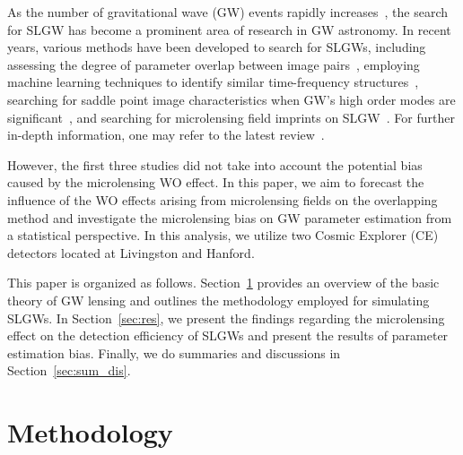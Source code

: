 \documentclass[fleqn,usenatbib]{mnras}
\begin{document}
As the number of gravitational wave (GW) events rapidly increases~\citep{LIGOScientific:2018mvr, abbott2021gwtc2, LIGOScientific:2021djp}, the search for SLGW has become a prominent area of research in GW astronomy.
In recent years, various methods have been developed to search for SLGWs, including assessing the degree of parameter overlap between image pairs~\citep{Haris:2018vmn, Dai:2020tpj, Lo:2021nae, Gao:2023uxi}, employing machine learning techniques to identify similar time-frequency structures~\citep{Kim:2020xkm, Goyal:2021hxv}, searching for saddle point image characteristics when GW's high order modes are significant~\citep{Dai:2017huk, Wang:2021kzt, Janquart:2021nus}, and searching for microlensing field imprints on SLGW~\citep{Shan:2023ngi}.
For further in-depth information, one may refer to the latest review~\citep{Liao:2022gde}.

However, the first three studies did not take into account the potential bias caused by the microlensing WO effect.
In this paper, we aim to forecast the influence of the WO effects arising from microlensing fields on the overlapping method and investigate the microlensing bias on GW parameter estimation from a statistical perspective.
In this analysis, we utilize two Cosmic Explorer (CE)~\citep{Evans:2016mbw} detectors located at Livingston and Hanford.

This paper is organized as follows. 
Section~\ref{sec:met} provides an overview of the basic theory of GW lensing and outlines the methodology employed for simulating SLGWs.
In Section~\ref{sec:res}, we present the findings regarding the microlensing effect on the detection efficiency of SLGWs and present the results of parameter estimation bias.
Finally, we do summaries and discussions in Section~\ref{sec:sum_dis}.


\section{Methodology}
\label{sec:met}
\end{document}

